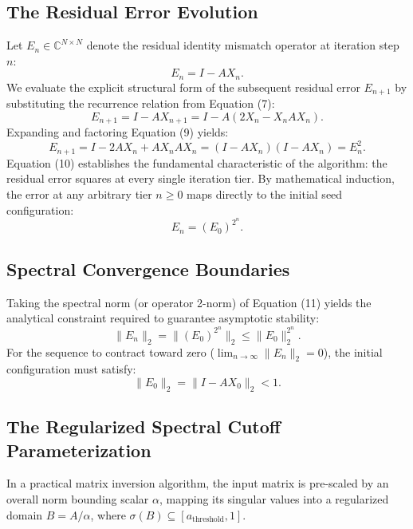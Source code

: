 \documentclass[11pt,a4paper]{article}
\begin{document}
\subsection{The Residual Error Evolution}
Let $E_n \in \mathbb{C}^{N \times N}$ denote the residual identity mismatch operator at iteration step $n$:
\begin{equation}
E_n = I - A X_n.
\end{equation}
We evaluate the explicit structural form of the subsequent residual error $E_{n+1}$ by substituting the recurrence relation from Equation (7):
\begin{equation}
E_{n+1} = I - A X_{n+1} = I - A \left( 2X_n - X_n A X_n \right).
\end{equation}
Expanding and factoring Equation (9) yields:
\begin{equation}
E_{n+1} = I - 2A X_n + A X_n A X_n = (I - A X_n)(I - A X_n) = E_n^2.
\end{equation}
Equation (10) establishes the fundamental characteristic of the algorithm: the residual error squares at every single iteration tier. By mathematical induction, the error at any arbitrary tier $n \geq 0$ maps directly to the initial seed configuration:
\begin{equation}
E_n = (E_0)^{2^n}.
\end{equation}

\subsection{Spectral Convergence Boundaries}
Taking the spectral norm (or operator 2-norm) of Equation (11) yields the analytical constraint required to guarantee asymptotic stability:
\begin{equation}
\|E_n\|_2 = \|(E_0)^{2^n}\|_2 \leq \|E_0\|_2^{2^n}.
\end{equation}
For the sequence to contract toward zero ($\lim_{n \to \infty} \|E_n\|_2 = 0$), the initial configuration must satisfy:
\begin{equation}
\|E_0\|_2 = \|I - A X_0\|_2 < 1.
\end{equation}

\subsection{The Regularized Spectral Cutoff Parameterization}
In a practical matrix inversion algorithm, the input matrix is pre-scaled by an overall norm bounding scalar $\alpha$, mapping its singular values into a regularized domain $B = A/\alpha$, where $\sigma(B) \subseteq [a_{\text{threshold}}, 1]$. 
\end{document}
